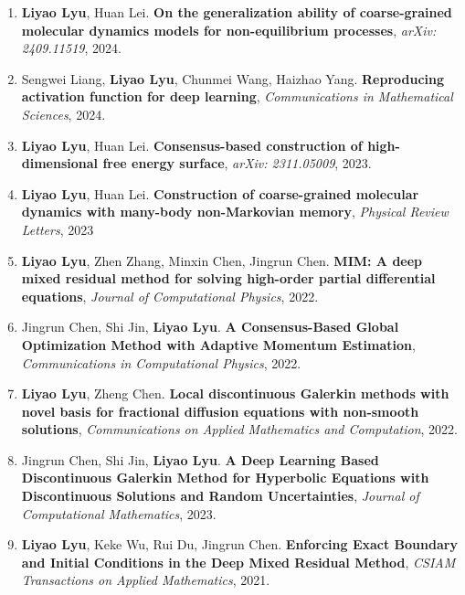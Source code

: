 \documentclass[letterpaper,10.8pt]{article}
\begin{document}
\begin{enumerate}
\setlength{\itemsep}{0pt}
    \setlength{\itemsep}{0pt}
    \setlength{\parskip}{0pt}
    
\item \textbf{{{\color{MSLightBlue}Liyao Lyu}}}, Huan Lei.\textbf{ On the generalization ability of coarse-grained molecular dynamics models for non-equilibrium processes}, \emph{arXiv: 2409.11519}, 2024.

\item Sengwei Liang, \textbf{{{\color{MSLightBlue}Liyao Lyu}}}, Chunmei Wang, Haizhao Yang.\textbf{ Reproducing activation function for deep learning}, \emph{Communications in Mathematical Sciences}, 2024.

\item \textbf{{{\color{MSLightBlue}Liyao Lyu}}}, Huan Lei. \textbf{ Consensus-based construction of high-dimensional free energy surface}, \emph{arXiv: 2311.05009}, 2023.


\item \textbf{{{\color{MSLightBlue}Liyao Lyu}}}, Huan Lei.\textbf{ Construction of coarse-grained molecular dynamics with many-body non-Markovian memory}, \emph{Physical Review Letters},  2023

\item \textbf{{{\color{MSLightBlue}Liyao Lyu}}}, Zhen Zhang, Minxin Chen, Jingrun Chen.\textbf{ MIM: A deep mixed residual method for solving high-order partial differential equations}, \emph{Journal of Computational Physics},  2022. 

\item Jingrun Chen, Shi Jin, \textbf{{{\color{MSLightBlue}Liyao Lyu}}}.\textbf{ A Consensus-Based Global Optimization Method with Adaptive Momentum Estimation}, \emph{Communications in Computational Physics}, 2022.

\item \textbf{{{\color{MSLightBlue}Liyao Lyu}}}, Zheng Chen.\textbf{ Local discontinuous Galerkin methods with novel basis for fractional diffusion equations with non-smooth solutions}, \emph{Communications on Applied Mathematics and Computation}, 2022.

\item Jingrun Chen, Shi Jin, \textbf{{{\color{MSLightBlue}Liyao Lyu}}}.\textbf{ A Deep Learning Based Discontinuous Galerkin Method for Hyperbolic Equations with Discontinuous Solutions and Random Uncertainties}, \emph{Journal of Computational Mathematics}, 2023.

\item \textbf{{{\color{MSLightBlue}Liyao Lyu}}}, Keke Wu, Rui Du, Jingrun Chen.\textbf{  Enforcing Exact Boundary and Initial Conditions in the Deep Mixed Residual Method}, \emph{CSIAM Transactions on Applied Mathematics}, 2021.


\end{enumerate}
\end{document}
